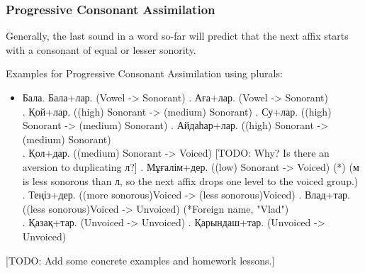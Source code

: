 \documentclass[main.tex]{subfiles}
\begin{document}
\subsubsection{Progressive Consonant Assimilation}
Generally, the last sound in a word so-far will predict that the next affix starts with a consonant of equal or lesser sonority.

Examples for Progressive Consonant Assimilation using plurals:
\begin{itemize}
\item Бала. Бала+лар. (Vowel -> Sonorant)
. Аға+лар. (Vowel -> Sonorant)
\\
. Қой+лар. ((high) Sonorant -> (medium) Sonorant)
. Су+лар. ((high) Sonorant -> (medium) Sonorant)
. Айдаһар+лар. ((high) Sonorant -> (medium) Sonorant)
\\
. Қол+дар. ((medium) Sonorant -> Voiced) [TODO: Why? Is there an aversion to duplicating л?]
. Мұғалім+дер. ((low) Sonorant -> Voiced) (*) (м is less sonorous than л, so the next affix drops one level to the voiced group.)
\\
. Теңіз+дер. ((more sonorous)Voiced -> (less sonorous)Voiced)
. Влад+тар. ((less sonorous)Voiced -> Unvoiced) (*Foreign name, "Vlad")
\\
. Қазақ+тар. (Unvoiced -> Unvoiced)
. Қарындаш+тар. (Unvoiced -> Unvoiced)
\end{itemize}

[TODO: Add some concrete examples and homework lessons.]
\end{document}
